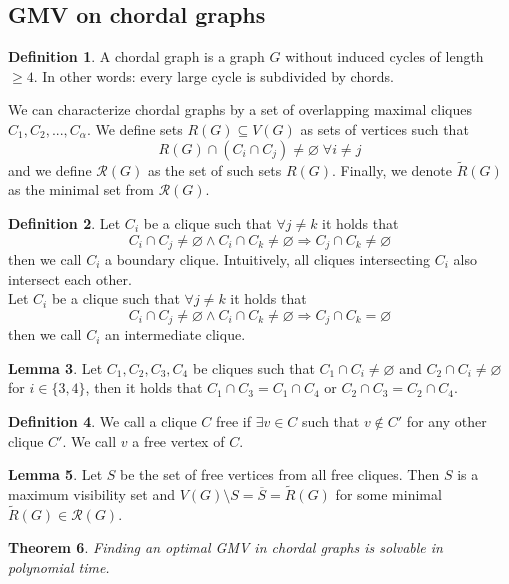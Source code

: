 \documentclass[a4paper, 12pt]{article}
\theoremstyle{plain}
\newtheorem{theorem}{Theorem}[section] %
\theoremstyle{definition}
\newtheorem{definition}[theorem]{Definition} %
\theoremstyle{lemma}
\newtheorem{lemma}[theorem]{Lemma}
\theoremstyle{remark}
\theoremstyle{corollary}
\theoremstyle{example}
\begin{document}
	\subsection{GMV on chordal graphs}
	\begin{definition}
		A chordal graph is a graph $G$ without induced cycles of length $\geq 4$. In other words: every large cycle is subdivided by chords.
	\end{definition}
	We can characterize chordal graphs by a set of overlapping maximal cliques $C_1,C_2,...,C_\alpha$. We define sets $R(G) \subseteq V(G)$ as sets of vertices such that \[R(G) \cap (C_i \cap C_j) \neq \varnothing \; \forall i\neq j\] and we define $\mathcal{R}(G)$ as the set of such sets $R(G)$. Finally, we denote $\tilde{R}(G)$ as the minimal set from $\mathcal{R}(G)$.
	\begin{definition}
		Let $C_i$ be a clique such that $\forall j\neq k$ it holds that \[C_i \cap C_j \neq \varnothing \land C_i \cap C_k \neq  \varnothing \Rightarrow C_j \cap C_k \neq \varnothing\] then we call $C_i$ a boundary clique. Intuitively, all cliques intersecting $C_i$ also intersect each other.\\
		Let $C_i$ be a clique such that $\forall j\neq k$ it holds that \[C_i \cap C_j \neq \varnothing \land C_i \cap C_k \neq \varnothing \Rightarrow C_j \cap C_k = \varnothing\] then we call $C_i$ an intermediate clique.
	\end{definition}
	\begin{lemma}
		Let $C_1,C_2,C_3,C_4$ be cliques such that $C_1 \cap C_i \neq \varnothing$ and $C_2 \cap C_i \neq \varnothing$ for $i \in \{3,4\}$, then it holds that $C_1 \cap C_3 = C_1 \cap C_4$ or $C_2 \cap C_3 = C_2 \cap C_4$.
	\end{lemma}
	\begin{definition}
		We call a clique $C$ free if $\exists v \in C$ such that $v \notin C'$ for any other clique $C'$. We call $v$ a free vertex of $C$.
	\end{definition}
	\begin{lemma}
		Let $S$ be the set of free vertices from all free cliques. Then $S$ is a maximum visibility set and $V(G) \setminus S = \overline{S} = \tilde{R}(G)$ for some minimal $\tilde{R}(G) \in \mathcal{R}(G)$.
	\end{lemma}
	\begin{theorem}
		Finding an optimal GMV in chordal graphs is solvable in polynomial time.
	\end{theorem}
\end{document}
